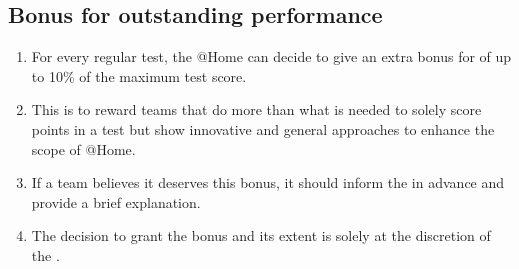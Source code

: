 \subsection{Bonus for outstanding performance}\label{rule:outstanding_performance}
\begin{enumerate}
	\item For every regular test, the @Home \TC{} can decide to give an extra bonus for  of up to 10\% of the maximum test score.

	\item This is to reward teams that do more than what is needed to solely score points in a test but show innovative and general approaches to enhance the scope of @Home.

	\item If a team believes it deserves this bonus, it should inform the \TC{} in advance and provide a brief explanation.

	\item The decision to grant the bonus and its extent is solely at the discretion of the \TC{}.
\end{enumerate}
